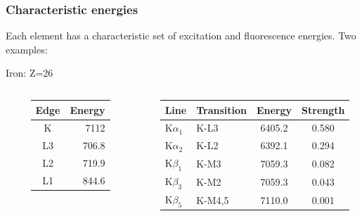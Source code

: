 \documentclass[10pt, xcolor=x11names, compress, handout]{beamer}
\begin{document}
\begin{frame}
  \frametitle{Characteristic energies}
  
  Each element has a characteristic set of excitation and
  fluorescence energies.  Two examples:

  \begin{block}{Iron: Z=26}
    \footnotesize
    \begin{columns}[T]
      \begin{column}{0.05\linewidth}
      \end{column}
      \begin{column}{0.2\linewidth}
        \begin{tabular}{cr}
          Edge &  Energy \\
          \hline
          \alert{K}    & \alert{7112}    \\
          L3   & 706.8   \\
          L2   & 719.9   \\
          L1   & 844.6
        \end{tabular}
      \end{column}
      \begin{column}{0.05\linewidth}
      \end{column}
      \begin{column}{0.7\linewidth}
        \begin{tabular}{llcc}
          Line & Transition & Energy &  Strength \\
          \hline
          K$\alpha_1$ & \alert{K}-L3 & 6405.2 & 0.580\\
          K$\alpha_2$ & \alert{K}-L2 & 6392.1 & 0.294\\
          K$\beta_1$  & \alert{K}-M3 & 7059.3 & 0.082\\
          K$\beta_3$  & \alert{K}-M2 & 7059.3 & 0.043\\
          K$\beta_5$  & \alert{K}-M4,5 & 7110.0 & 0.001
        \end{tabular}
      \end{column}
    \end{columns}
  \end{block}


\end{frame}
\end{document}
